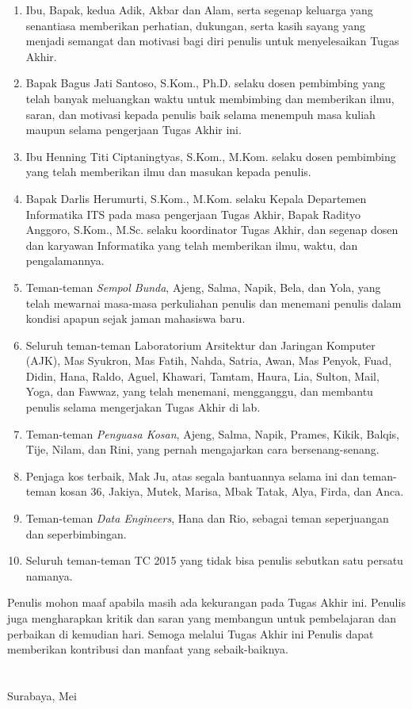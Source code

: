\begin{enumerate}
	\item Ibu, Bapak, kedua Adik, Akbar dan Alam, serta segenap keluarga yang senantiasa memberikan perhatian, dukungan, serta kasih sayang yang menjadi semangat dan motivasi bagi diri penulis untuk menyelesaikan Tugas Akhir.
	\item Bapak Bagus Jati Santoso, S.Kom., Ph.D. selaku dosen pembimbing yang telah banyak meluangkan waktu untuk membimbing dan memberikan ilmu, saran, dan motivasi kepada penulis baik selama menempuh masa kuliah maupun selama pengerjaan Tugas Akhir ini.
	\item Ibu Henning Titi Ciptaningtyas, S.Kom., M.Kom. selaku dosen pembimbing yang telah memberikan ilmu dan masukan kepada penulis.
	\item Bapak Darlis Herumurti, S.Kom., M.Kom. selaku Kepala Departemen Informatika ITS pada masa pengerjaan Tugas Akhir, Bapak Radityo Anggoro, S.Kom., M.Sc. selaku koordinator Tugas Akhir, dan segenap dosen dan karyawan Informatika yang telah memberikan ilmu, waktu, dan pengalamannya.
	\item Teman-teman \textit{Sempol Bunda}, Ajeng, Salma, Napik, Bela, dan Yola, yang telah mewarnai masa-masa perkuliahan penulis dan menemani penulis dalam kondisi apapun sejak jaman mahasiswa baru.
	\item Seluruh teman-teman Laboratorium Arsitektur dan Jaringan Komputer (AJK), Mas Syukron, Mas Fatih, Nahda, Satria, Awan, Mas Penyok, Fuad, Didin, Hana, Raldo, Aguel, Khawari, Tamtam, Haura, Lia, Sulton, Mail, Yoga, dan Fawwaz, yang telah menemani, mengganggu, dan membantu penulis selama mengerjakan Tugas Akhir di lab.
	\item Teman-teman \textit{Penguasa Kosan}, Ajeng, Salma, Napik, Prames, Kikik, Balqis, Tije, Nilam, dan Rini, yang pernah mengajarkan cara bersenang-senang. 
	\item Penjaga kos terbaik, Mak Ju, atas segala bantuannya selama ini dan teman-teman kosan 36, Jakiya, Mutek, Marisa, Mbak Tatak, Alya, Firda, dan Anca.
	\item Teman-teman \textit{Data Engineers}, Hana dan Rio, sebagai teman seperjuangan dan seperbimbingan.
	\item Seluruh teman-teman TC 2015 yang tidak bisa penulis sebutkan satu persatu namanya.
\end{enumerate}

Penulis mohon maaf apabila masih ada kekurangan pada Tugas Akhir ini. Penulis juga mengharapkan kritik dan saran yang membangun untuk pembelajaran dan perbaikan di kemudian hari. Semoga melalui Tugas Akhir ini Penulis dapat memberikan kontribusi dan manfaat yang sebaik-baiknya. \\ \\ \\

\hfill Surabaya, Mei \tahun \\ \\ \\

\hfill \penulis \\
\cleardoublepage
